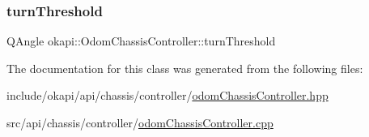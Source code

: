 \mbox{\label{classokapi_1_1OdomChassisController_ac0d74721713d2928a047562675ae25ef}} 
\subsubsection{\texorpdfstring{turnThreshold}{turnThreshold}}
{\footnotesize\ttfamily Q\+Angle okapi\+::\+Odom\+Chassis\+Controller\+::turn\+Threshold\hspace{0.3cm}{\ttfamily [protected]}}



The documentation for this class was generated from the following files\+:\begin{DoxyCompactItemize}
\item 
include/okapi/api/chassis/controller/\mbox{\hyperlink{odomChassisController_8hpp}{odom\+Chassis\+Controller.\+hpp}}\item 
src/api/chassis/controller/\mbox{\hyperlink{odomChassisController_8cpp}{odom\+Chassis\+Controller.\+cpp}}\end{DoxyCompactItemize}
